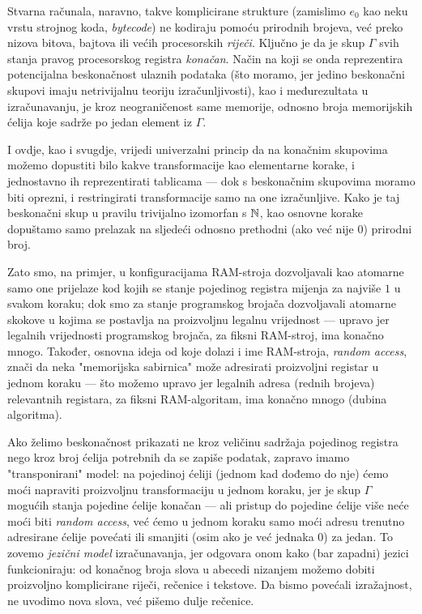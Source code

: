 Stvarna računala, naravno, takve komplicirane strukture (zamislimo $e_0$ kao neku vrstu strojnog koda, \emph{bytecode}) ne kodiraju pomoću prirodnih brojeva, već preko nizova bitova, bajtova ili većih procesorskih \emph{riječi}. Ključno je da je skup $\Gamma$ svih stanja pravog procesorskog registra \emph{konačan}. Način na koji se onda reprezentira potencijalna beskonačnost ulaznih podataka (što moramo, jer jedino beskonačni skupovi imaju netrivijalnu teoriju izračunljivosti), kao i međurezultata u izračunavanju, je kroz neograničenost same memorije, odnosno broja memorijskih ćelija koje sadrže po jedan element iz $\Gamma$.

I ovdje, kao i svugdje, vrijedi univerzalni princip da na konačnim skupovima možemo dopustiti bilo kakve transformacije kao elementarne korake, i jednostavno ih reprezentirati tablicama --- dok s beskonačnim skupovima moramo biti oprezni, i restringirati transformacije samo na one izračunljive. Kako je taj beskonačni skup u pravilu trivijalno izomorfan s ${\mathbb N}$, kao osnovne korake dopuštamo samo prelazak na sljedeći odnosno prethodni (ako već nije $0$) prirodni broj.

Zato smo, na primjer, u konfiguracijama RAM-stroja dozvoljavali kao atomarne samo one prijelaze kod kojih se stanje pojedinog registra mijenja za najviše $1$ u svakom koraku; dok smo za stanje programskog brojača dozvoljavali atomarne skokove u kojima se postavlja na proizvoljnu legalnu vrijednost --- upravo jer legalnih vrijednosti programskog brojača, za fiksni RAM-stroj, ima konačno mnogo. Također, osnovna ideja od koje dolazi i ime RAM-stroja, \emph{random access}, znači da neka "memorijska sabirnica" može adresirati proizvoljni registar u jednom koraku --- što možemo upravo jer legalnih adresa (rednih brojeva) relevantnih registara, za fiksni RAM-algoritam, ima konačno mnogo (dubina algoritma).

Ako želimo beskonačnost prikazati ne kroz veličinu sadržaja pojedinog registra nego kroz broj ćelija potrebnih da se zapiše podatak, zapravo imamo "transponirani" model: na pojedinoj ćeliji (jednom kad dođemo do nje) ćemo moći napraviti proizvoljnu transformaciju u jednom koraku, jer je skup $\Gamma$ mogućih stanja pojedine ćelije konačan --- ali pristup do pojedine ćelije više neće moći biti \emph{random access}, već ćemo u jednom koraku samo moći adresu trenutno adresirane ćelije povećati ili smanjiti (osim ako je već jednaka $0$) za jedan. To zovemo \emph{jezični model} izračunavanja, jer odgovara onom kako (bar zapadni) jezici funkcioniraju: od konačnog broja slova u abecedi nizanjem možemo dobiti proizvoljno komplicirane riječi, rečenice i tekstove. Da bismo povećali izražajnost, ne uvodimo nova slova, već pišemo dulje rečenice.


